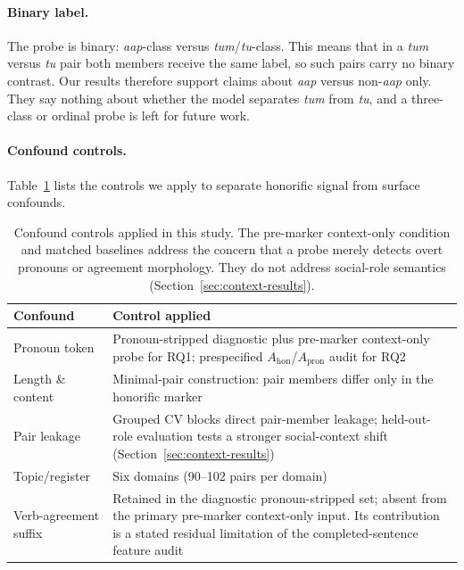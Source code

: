 \documentclass[11pt]{article}
\newcommand{\aap}{\textit{aap}}
\newcommand{\tum}{\textit{tum}}
\newcommand{\tu}{\textit{tu}}
\begin{document}
\paragraph{Binary label.}
The probe is binary: \aap{}-class versus \tum{}/\tu{}-class. This means that in a
\tum{} versus \tu{} pair both members receive the same label, so such pairs
carry no binary contrast. Our results therefore support claims about \aap{}
versus non-\aap{} only. They say nothing about whether the model separates
\tum{} from \tu{}, and a three-class or ordinal probe is left for future work.

\paragraph{Confound controls.}
Table~\ref{tab:confounds} lists the controls we apply to separate honorific
signal from surface confounds.
\label{sec:confounds}

\begin{table}[t]
\centering
\small
\setlength\tabcolsep{3pt}
\begin{tabular}{p{2.0cm}p{4.9cm}}
\toprule
\textbf{Confound} & \textbf{Control applied} \\
\midrule
Pronoun token & Pronoun-stripped diagnostic plus pre-marker context-only probe for RQ1; prespecified $A_{\mathrm{hon}}$/$A_{\mathrm{pron}}$ audit for RQ2 \\
Length \& content & Minimal-pair construction: pair members differ only in the honorific marker \\
Pair leakage & Grouped CV blocks direct pair-member leakage; held-out-role evaluation tests a stronger social-context shift (Section~\ref{sec:context-results}) \\
Topic/register & Six domains (90--102 pairs per domain) \\
Verb-agreement suffix & Retained in the diagnostic pronoun-stripped set;
  absent from the primary pre-marker context-only input. Its contribution is a
  stated residual limitation of the completed-sentence feature audit \\
\bottomrule
\end{tabular}
\caption{Confound controls applied in this study. The pre-marker context-only
  condition and matched baselines address the concern that a probe merely
  detects overt pronouns or agreement morphology. They do not address
  social-role semantics (Section~\ref{sec:context-results}).}
\label{tab:confounds}
\end{table}
\end{document}
